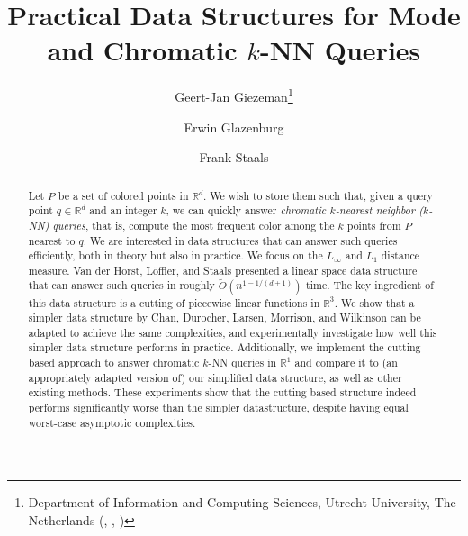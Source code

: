 \documentclass[twoside,leqno,twocolumn]{article}
\title{Practical Data Structures for Mode and Chromatic $k$-NN Queries}
\author{Geert-Jan Giezeman\thanks{Department of Information and Computing Sciences, Utrecht University, The Netherlands (\email{g.j.giezeman@uu.nl}, \email{e.p.glazenburg@uu.nl}, \email{f.staals@uu.nl})} \and 
Erwin Glazenburg\footnotemark[1] \and
Frank Staals\footnotemark[1]}
\newcommand{\R} {\mathbb{R}\xspace}
\begin{document}
\date{}

\maketitle


\begin{abstract}
  Let $P$ be a set of colored points in $\R^d$. We wish to store them such that, given a query point $q \in \R^d$ and an integer $k$, we
  can quickly answer \emph{chromatic $k$-nearest neighbor ($k$-NN) queries}, that is, compute the most frequent color among the $k$ points from $P$ nearest to $q$. We are interested in data structures that can answer such queries efficiently, both in theory but also in practice. We focus on the $L_\infty$ and $L_1$ distance measure. Van der Horst, Löffler, and Staals presented a linear space data structure that can answer such queries in roughly $\tilde{O}(n^{1 - 1/(d+1)})$ time. The key ingredient of this data structure is a cutting of piecewise linear functions in $\R^3$.  We show that a simpler data structure by Chan, Durocher, Larsen, Morrison, and Wilkinson can be adapted to achieve the same complexities, and experimentally investigate how well this simpler data structure performs in practice.  Additionally, we implement the cutting based approach to answer chromatic $k$-NN queries in $\R^1$ and compare it to (an appropriately adapted version of) our simplified data structure, as well as other existing methods. These experiments show that the cutting based structure indeed performs significantly worse than the simpler datastructure, despite having equal worst-case asymptotic complexities.
\end{abstract}

\clearpage
\end{document}
